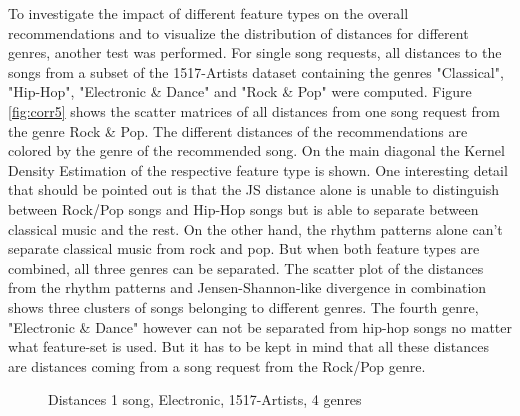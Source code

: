 \noindent To investigate the impact of different feature types on the overall recommendations and to visualize the distribution of distances for different genres, another test was performed. For single song requests, all distances to the songs from a subset of the 1517-Artists dataset containing the genres "Classical", "Hip-Hop", "Electronic \& Dance" and "Rock \& Pop" were computed. Figure \ref{fig:corr5} shows the scatter matrices of all distances from one song request from the genre Rock \& Pop. The different distances of the recommendations are colored by the genre of the recommended song. 
\noindent On the main diagonal the Kernel Density Estimation of the respective feature type is shown. One interesting detail that should be pointed out is that the JS distance alone is unable to distinguish between Rock/Pop songs and Hip-Hop songs but is able to separate between classical music and the rest. On the other hand, the rhythm patterns alone can't separate classical music from rock and pop. But when both feature types are combined, all three genres can be separated. The scatter plot of the distances from the rhythm patterns and Jensen-Shannon-like divergence in combination shows three clusters of songs belonging to different genres. The fourth genre, "Electronic \& Dance" however can not be separated from hip-hop songs no matter what feature-set is used. But it has to be kept in mind that all these distances are distances coming from a song request from the Rock/Pop genre. 

\begin{figure}[htbp]
	\centering
	\caption{Distances 1 song, Electronic, 1517-Artists, 4 genres}
	\label{fig:corr6}
\end{figure}
\FloatBarrier

